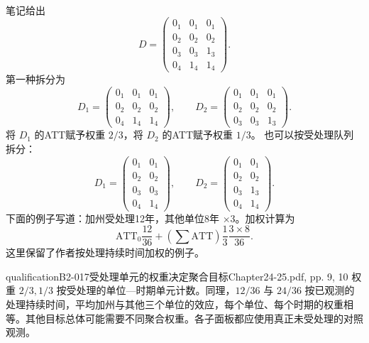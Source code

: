 \paragraph{}
笔记给出
\[
D=\begin{pmatrix}
0_1&0_1&0_1\\0_2&0_2&0_2\\0_3&0_3&1_3\\0_4&1_4&1_4
\end{pmatrix}.
\]
第一种拆分为
\[
D_1=\begin{pmatrix}0_1&0_1&0_1\\0_2&0_2&0_2\\0_4&1_4&1_4\end{pmatrix},
\qquad
D_2=\begin{pmatrix}0_1&0_1&0_1\\0_2&0_2&0_2\\0_3&0_3&1_3\end{pmatrix}.
\]
将 \(D_1\) 的ATT赋予权重 \(2/3\)，将 \(D_2\) 的ATT赋予权重 \(1/3\)。
 也可以按受处理队列拆分：
\[
D_1=\begin{pmatrix}0_1&0_1\\0_2&0_2\\0_3&0_3\\0_4&1_4\end{pmatrix},
\qquad
D_2=\begin{pmatrix}0_1&0_1\\0_2&0_2\\0_3&1_3\\0_4&1_4\end{pmatrix}.
\]
下面的例子写道：加州受处理12年，其他单位8年 \(\times3\)。加权计算为
\[
\mathrm{ATT}_0\frac{12}{36}
+\left(\sum\mathrm{ATT}\right)\frac13\frac{3\times8}{36}.
\]
这里保留了作者按处理持续时间加权的例子。
\begin{reviewnote}{qualification}{B2-017}{受处理单元的权重决定聚合目标}{Chapter24-25.pdf, pp. 9, 10}
权重 \(2/3,1/3\) 按受处理的单位—时期单元计数。同理，\(12/36\) 与 \(24/36\) 按已观测的处理持续时间，平均加州与其他三个单位的效应，每个单位、每个时期的权重相等。其他目标总体可能需要不同聚合权重。各子面板都应使用真正未受处理的对照观测。
\par{}
\end{reviewnote}


